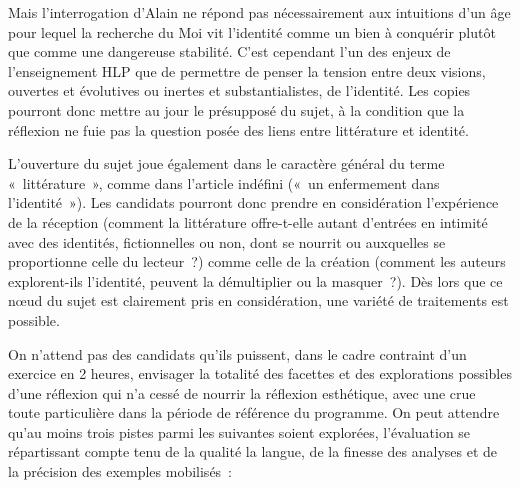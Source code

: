 {Mais l'interrogation d'Alain ne répond pas nécessairement aux intuitions d'un âge
pour lequel la recherche du Moi vit l'identité comme un bien à conquérir plutôt que
comme une dangereuse stabilité. C'est cependant l'un des enjeux de l'enseignement
HLP que de permettre de penser la tension entre deux visions, ouvertes et évolutives
ou inertes et substantialistes, de l'identité. Les copies pourront donc mettre au jour le
présupposé du sujet, à la condition que la réflexion ne fuie pas la question posée des
liens entre littérature et identité.

L'ouverture du sujet joue également dans le caractère général du terme «~littérature~»,
comme dans l'article indéfini («~un enfermement dans l'identité~»). Les candidats
pourront donc prendre en considération l'expérience de la réception (comment la
littérature offre-t-elle autant d'entrées en intimité avec des identités, fictionnelles ou
non, dont se nourrit ou auxquelles se proportionne celle du lecteur~?) comme celle de
la création (comment les auteurs explorent-ils l'identité, peuvent la démultiplier ou la
masquer~?). Dès lors que ce nœud du sujet est clairement pris en considération, une
variété de traitements est possible.

On n'attend pas des candidats qu'ils puissent, dans le cadre contraint d'un exercice en
2 heures, envisager la totalité des facettes et des explorations possibles d'une réflexion
qui n'a cessé de nourrir la réflexion esthétique, avec une crue toute particulière dans la
période de référence du programme. On peut attendre qu'au moins trois pistes parmi
les suivantes soient explorées, l'évaluation se répartissant compte tenu de la qualité la
langue, de la finesse des analyses et de la précision des exemples mobilisés~:

}
